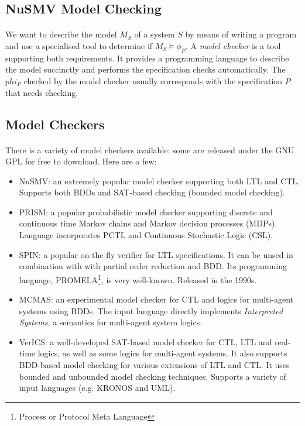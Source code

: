 \documentclass{article}
\theoremstyle{plain}
\theoremstyle{definition}
\begin{document}
\begin{multicols}{2}
\section{NuSMV Model Checking}

\paragraph{} We want to describe the model $M_S$ of a system $S$ by means of writing a program and use a specialised tool to determine if $M_S \models \phi_P$. A \textit{model checker} is a tool supporting both requirements. It provides a programming language to describe the model succinctly and performs the specification checks automatically. The $phi_P$ checked by the model checker usually corresponds with the specification $P$ that needs checking.

\subsection{Model Checkers}

\paragraph{} There is a variety of model checkers available: some are released under the GNU GPL for free to download. Here are a few:

\begin{itemize}
\item NuSMV: an extremely popular model checker supporting both LTL and CTL. Supports both BDDs and SAT-based checking (bounded model checking). 
\item PRISM: a popular probabilistic model checker supporting discrete and continuous time Markov chains and Markov decision processes (MDPs). Language incorporates PCTL and Continuous Stochastic Logic (CSL).
\item SPIN: a popular on-the-fly verifier for LTL specifications. It can be unsed in combination with with partial order reduction and BDD. Its programming language, PROMELA\footnote{Process or Protocol Meta Language}, is very well-known. Released in the 1990s.
\item MCMAS: an experimental model checker for CTL and logics for multi-agent systems using BDDs. The input language directly implements \textit{Interpreted Systems}, a semantics for multi-agent system logics.
\item VerICS: a well-developed SAT-based model checker for CTL, LTL and real-time logics, as well as some logics for multi-agent systems. It also supports BDD-based model checking for various extensions of LTL and CTL. It uses bounded and unbounded model checking techniques. Supports a variety of input languages (e.g. KRONOS and UML).
\end{itemize}


\end{multicols}
\end{document}
